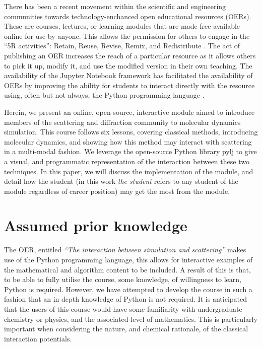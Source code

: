 \documentclass[amsmath,amssymb,twocolumn,superscriptaddress,aps,prl]{revtex4-1}
\begin{document}
There has been a recent movement within the scientific and engineering communities towards technology-enchanced open educational resources (OERs).
These are courses, lectures, or learning modules that are made free available online for use by anyone.
This allows the permission for others to engage in the ``5R activities'': Retain, Reuse, Revise, Remix, and Redistribute \cite{opencontent2018}.
The act of publishing an OER increases the reach of a particular resource as it allows others to pick it up, modify it, and use the modified version in their own teaching.
The availability of the Jupyter Notebook framework \cite{Kluyver2016} has facilitated the availability of OERs by improving the ability for students to interact directly with the resource using, often but not always, the Python programming language \cite{Barba2017}.

Herein, we present an online, open-source, interactive module aimed to introduce members of the scattering and diffraction community to molecular dynamics simulation.
This course follows six lessons, covering classical methods, introducing molecular dynamics, and showing how this method may interact with scattering in a multi-modal fashion.
We leverage the open-source Python library pylj \cite{McCluskey2018} to give a visual, and programmatic representation of the interaction between these two techniques.
In this paper, we will discuss the implementation of the module, and detail how the student (in this work \emph{the student} refers to any student of the module regardless of career position) may get the most from the module.

\section{Assumed prior knowledge}

The OER, entitled \emph{``The interaction between simulation and scattering''} makes use of the Python programming language, this allows for interactive examples of the mathematical and algorithm content to be included.
A result of this is that, to be able to fully utilise the course, some knowledge, of willingness to learn, Python is required.
However, we have attempted to develop the course in such a fashion that an in depth knowledge of Python is not required.
It is anticipated that the users of this course would have some familiarity with undergraduate chemistry or physics, and the associated level of mathematics.
This is particularly important when considering the nature, and chemical rationale, of the classical interaction potentials.
\end{document}
